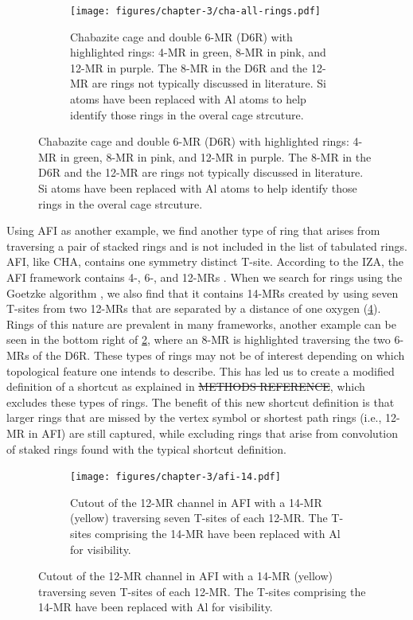 \documentclass[preprint,numrefs,noinfo,sort&compress]{elsarticle}
\providecommand{\DIFadd}[1]{{\protect\color{blue}\uwave{#1}}} %
\providecommand{\DIFdel}[1]{{\protect\color{red}\sout{#1}}}                      %
\providecommand{\DIFaddbegin}{} %
\providecommand{\DIFaddend}{} %
\providecommand{\DIFdelbegin}{} %
\providecommand{\DIFdelend}{} %
\newcommand{\DIFscaledelfig}{0.5}
\newlength{\DIFdelgraphicswidth} %
\newlength{\DIFdelgraphicsheight} %
\newcommand{\DIFaddincludegraphics}[2][]{{\color{blue}\fbox{\DIFOincludegraphics[#1]{#2}}}} %
\newcommand{\DIFdelincludegraphics}[2][]{%
\sbox{\DIFdelgraphicsbox}{\DIFOincludegraphics[#1]{#2}}%
\settoboxwidth{\DIFdelgraphicswidth}{\DIFdelgraphicsbox} %
\settoboxtotalheight{\DIFdelgraphicsheight}{\DIFdelgraphicsbox} %
\scalebox{\DIFscaledelfig}{%
\parbox[b]{\DIFdelgraphicswidth}{\usebox{\DIFdelgraphicsbox}\\[-\baselineskip] \rule{\DIFdelgraphicswidth}{0em}}\llap{\resizebox{\DIFdelgraphicswidth}{\DIFdelgraphicsheight}{%
\setlength{\unitlength}{\DIFdelgraphicswidth}%
\begin{picture}(1,1)%
\thicklines\linethickness{2pt} %
{\color[rgb]{1,0,0}\put(0,0){\framebox(1,1){}}}%
{\color[rgb]{1,0,0}\put(0,0){\line( 1,1){1}}}%
{\color[rgb]{1,0,0}\put(0,1){\line(1,-1){1}}}%
\end{picture}%
}\hspace*{3pt}}} %
} %
\DeclareRobustCommand{\DIFaddbegin}{\DIFOaddbegin \let\includegraphics\DIFaddincludegraphics} %
\DeclareRobustCommand{\DIFaddend}{\DIFOaddend \let\includegraphics\DIFOincludegraphics} %
\DeclareRobustCommand{\DIFdelbegin}{\DIFOdelbegin \let\includegraphics\DIFdelincludegraphics} %
\DeclareRobustCommand{\DIFdelend}{\DIFOaddend \let\includegraphics\DIFOincludegraphics} %
\begin{document}
\begin{figure}
\begin{figure}[H]
\centering
\texttt{[image: figures/chapter-3/cha-all-rings.pdf]}
\caption{Chabazite cage and double 6-MR (D6R) with highlighted rings: 4-MR in green, 8-MR in pink, and 12-MR in purple. The 8-MR in the D6R and the 12-MR are rings not typically discussed in literature. Si atoms have been replaced with Al atoms to help identify those rings in the overal cage strcuture. \label{fig:cha-rings}}
\end{figure}
\end{figure}

Using AFI as another example, we find another type of ring that arises from traversing a pair of stacked rings and is not included in the list of tabulated rings. AFI, like CHA, contains one symmetry distinct T-site. According to the IZA, the AFI framework contains 4-, 6-, and 12-MRs \cite{baerlocher-database-nodate}. When we search for rings using the Goetzke algorithm \cite{goetzke-properties-1991}, we also find that it contains 14-MRs created by using seven T-sites from two 12-MRs that are separated by a distance of one oxygen (\cref{fig:afi-14}). Rings of this nature are prevalent in many frameworks, another example can be seen in the bottom right of \cref{fig:cha-rings}, where an 8-MR is highlighted traversing the two 6-MRs of the D6R. These types of rings may not be of interest depending on which topological feature one intends to describe. This has led us to create a modified definition of a shortcut as explained in \DIFdelbegin \DIFdel{METHODS REFERENCE}\DIFdelend \DIFaddbegin \DIFadd{\mbox{%
\cref{section:modified}}\hskip0pt%
}\DIFaddend , which excludes these types of rings. The benefit of this new shortcut definition is that larger rings that are missed by the vertex symbol or shortest path rings (i.e., 12-MR in AFI) are still captured, while excluding rings that arise from convolution of staked rings found with the typical shortcut definition.

\begin{figure}
\begin{figure}[H]
\centering
\texttt{[image: figures/chapter-3/afi-14.pdf]}
\caption{Cutout of the 12-MR channel in AFI with a 14-MR (yellow) traversing seven T-sites of each 12-MR. The T-sites comprising the 14-MR have been replaced with Al for visibility. \label{fig:afi-14}}
\end{figure}
\end{figure}
\end{document}
